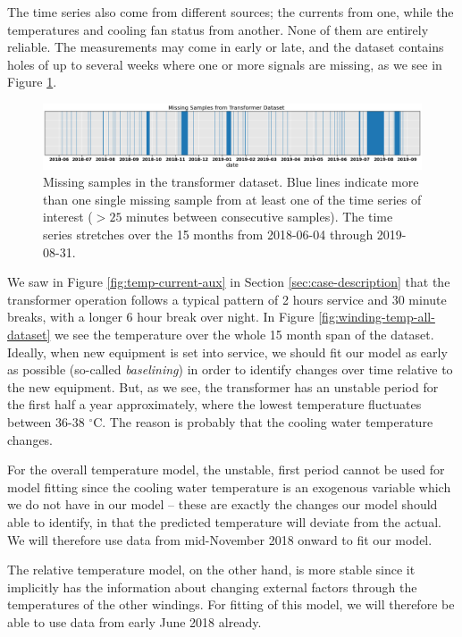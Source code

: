 \documentclass[]{article}
\begin{document}
The time series also come from different sources; the currents from one, while the temperatures and cooling fan status from another. None of them are entirely reliable. The measurements may come in early or late, and the dataset contains holes of up to several weeks where one or more signals are missing, as we see in Figure \ref{fig:missing-samples}.

\begin{figure}[!h]
	\centering
	\includegraphics[width=1\linewidth]{./figs/missing-samples.png}
	\caption{Missing samples in the transformer dataset. Blue lines indicate more than one single missing sample from at least one of the time series of interest ($>25$ minutes between consecutive samples). The time series stretches over the 15 months from 2018-06-04 through 2019-08-31.}
	\label{fig:missing-samples}
\end{figure}


We saw in Figure \ref{fig:temp-current-aux} in Section \ref{sec:case-description} that the transformer operation follows a typical pattern of 2 hours service and 30 minute breaks, with a longer 6 hour break over night. In Figure \ref{fig:winding-temp-all-dataset} we see the temperature over the whole 15 month span of the dataset. Ideally, when new equipment is set into service, we should fit our model as early as possible (so-called \textit{baselining}) in order to identify changes over time relative to the new equipment. But, as we see, the transformer has an unstable period for the first half a year approximately, where the lowest temperature fluctuates between 36-38 $^\circ$C. The reason is probably that the cooling water temperature changes. 

For the overall temperature model, the unstable, first period cannot be used for model fitting since the cooling water temperature is an exogenous variable which we do not have in our model -- these are exactly the changes our model should able to identify, in that the predicted temperature will deviate from the actual. We will therefore use data from mid-November 2018 onward to fit our model.

The relative temperature model, on the other hand, is more stable since it implicitly has the information about changing external factors through the temperatures of the other windings. For fitting of this model, we will therefore be able to use data from early June 2018 already.
\end{document}
